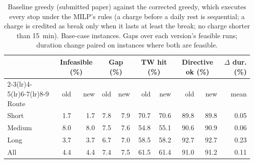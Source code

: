 \begin{table}[htbp]
\centering
\caption{Baseline greedy (submitted paper) against the corrected greedy, which executes every stop under the MILP's rules (a charge before a daily rest is sequential; a charge is credited as break only when it lasts at least the break; no charge shorter than 15~min).  Base-case instances.  Gaps over each version's feasible runs; duration change paired on instances where both are feasible.}
\label{tab:greedy-corrected}
\begin{tabular}{l rr rr rr rr r}
\toprule
 & \multicolumn{2}{c}{Infeasible (\%)} & \multicolumn{2}{c}{Gap (\%)} & \multicolumn{2}{c}{TW hit (\%)} & \multicolumn{2}{c}{Directive ok (\%)} & $\Delta$ dur. (\%) \\
\cmidrule(lr){2-3}\cmidrule(lr){4-5}\cmidrule(lr){6-7}\cmidrule(lr){8-9}
Route & old & new & old & new & old & new & old & new & mean \\
\midrule
Short & 1.7 & 1.7 & 7.8 & 7.9 & 70.7 & 70.6 & 89.8 & 89.8 & 0.05 \\
Medium & 8.0 & 8.0 & 7.5 & 7.6 & 54.8 & 55.1 & 90.6 & 90.9 & 0.06 \\
Long & 3.7 & 3.7 & 6.7 & 7.0 & 58.5 & 58.2 & 92.7 & 92.7 & 0.23 \\
All & 4.4 & 4.4 & 7.4 & 7.5 & 61.5 & 61.4 & 91.0 & 91.2 & 0.11 \\
\bottomrule
\end{tabular}
\end{table}
